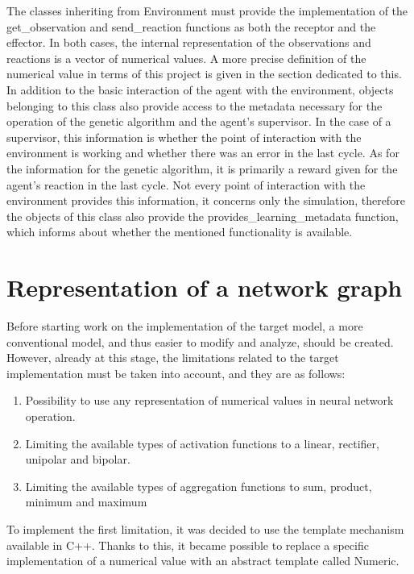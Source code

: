 The classes inheriting from Environment must provide the implementation of the 
get\_observation and send\_reaction functions as both the receptor and the effector. 
In both cases, the internal representation of the observations and reactions is a vector of 
numerical values. A more precise definition of the numerical value in terms of this project is 
given in the section dedicated to this.
In addition to the basic interaction of the agent with the environment, objects belonging to 
this class also provide access to the metadata necessary for the operation of the genetic 
algorithm and the agent's supervisor.
In the case of a supervisor, this information is whether the point of interaction with the 
environment is working and whether there was an error in the last cycle. 
As for the information for the genetic algorithm, it is primarily a reward given for the agent's 
reaction in the last cycle. 
Not every point of interaction with the environment provides this information, it concerns only 
the simulation, therefore the objects of this class also provide the provides\_learning\_metadata 
function, which informs about whether the mentioned functionality is available.


\FloatBarrier
\section{Representation of a network graph}

Before starting work on the implementation of the target model, a more conventional model, 
and thus easier to modify and analyze, should be created.
However, already at this stage, the limitations related to the target implementation must be 
taken into account, and they are as follows:
\begin{enumerate}
	\item Possibility to use any representation of numerical values in neural network operation.
    \item Limiting the available types of activation functions to a linear, rectifier, 
	unipolar and bipolar.
    \item Limiting the available types of aggregation functions to sum, product, minimum 
	and maximum
\end{enumerate}
To implement the first limitation, it was decided to use the template mechanism available in C++.
Thanks to this, it became possible to replace a specific implementation of a numerical value with
an abstract template called Numeric.

